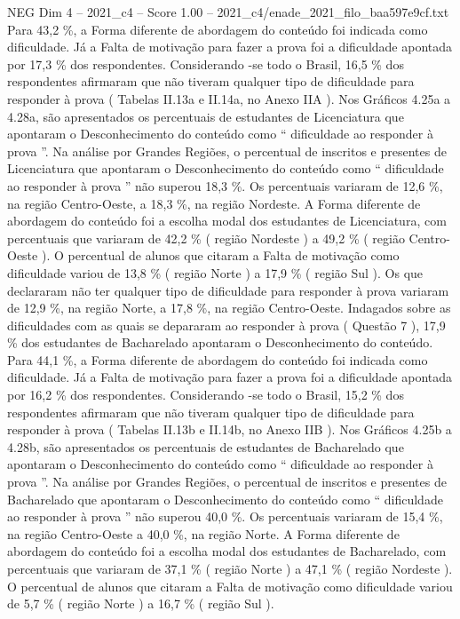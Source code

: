 \begin{textsample}{NEG Dim 4 – 2021\_c4 – Score 1.00 – 2021\_c4/enade\_2021\_filo\_baa597e9cf.txt}
Para 43,2 \%, a Forma diferente de abordagem do conteúdo foi indicada como dificuldade.
Já a Falta de motivação para fazer a prova foi a dificuldade apontada por 17,3 \% dos respondentes.
Considerando -se todo o Brasil, 16,5 \% dos respondentes afirmaram que não tiveram qualquer tipo de dificuldade para responder à prova ( Tabelas II.13a e II.14a, no Anexo IIA ).
Nos Gráficos 4.25a a 4.28a, são apresentados os percentuais de estudantes de Licenciatura que apontaram o Desconhecimento do conteúdo como “ dificuldade ao responder à prova ”.
Na análise por Grandes Regiões, o percentual de inscritos e presentes de Licenciatura que apontaram o Desconhecimento do conteúdo como “ dificuldade ao responder à prova ” não superou 18,3 \%.
Os percentuais variaram de 12,6 \%, na região Centro-Oeste, a 18,3 \%, na região Nordeste.
A Forma diferente de abordagem do conteúdo foi a escolha modal dos estudantes de Licenciatura, com percentuais que variaram de 42,2 \% ( região Nordeste ) a 49,2 \% ( região Centro-Oeste ).
O percentual de alunos que citaram a Falta de motivação como dificuldade variou de 13,8 \% ( região Norte ) a 17,9 \% ( região Sul ).
Os que declararam não ter qualquer tipo de dificuldade para responder à prova variaram de 12,9 \%, na região Norte, a 17,8 \%, na região Centro-Oeste.
Indagados sobre as dificuldades com as quais se depararam ao responder à prova ( Questão 7 ), 17,9 \% dos estudantes de Bacharelado apontaram o Desconhecimento do conteúdo.
Para 44,1 \%, a Forma diferente de abordagem do conteúdo foi indicada como dificuldade.
Já a Falta de motivação para fazer a prova foi a dificuldade apontada por 16,2 \% dos respondentes.
Considerando -se todo o Brasil, 15,2 \% dos respondentes afirmaram que não tiveram qualquer tipo de dificuldade para responder à prova ( Tabelas II.13b e II.14b, no Anexo IIB ).
Nos Gráficos 4.25b a 4.28b, são apresentados os percentuais de estudantes de Bacharelado que apontaram o Desconhecimento do conteúdo como “ dificuldade ao responder à prova ”.
Na análise por Grandes Regiões, o percentual de inscritos e presentes de Bacharelado que apontaram o Desconhecimento do conteúdo como “ dificuldade ao responder à prova ” não superou 40,0 \%.
Os percentuais variaram de 15,4 \%, na região Centro-Oeste a 40,0 \%, na região Norte.
A Forma diferente de abordagem do conteúdo foi a escolha modal dos estudantes de Bacharelado, com percentuais que variaram de 37,1 \% ( região Norte ) a 47,1 \% ( região Nordeste ).
O percentual de alunos que citaram a Falta de motivação como dificuldade variou de 5,7 \% ( região Norte ) a 16,7 \% ( região Sul ).

\end{textsample}
